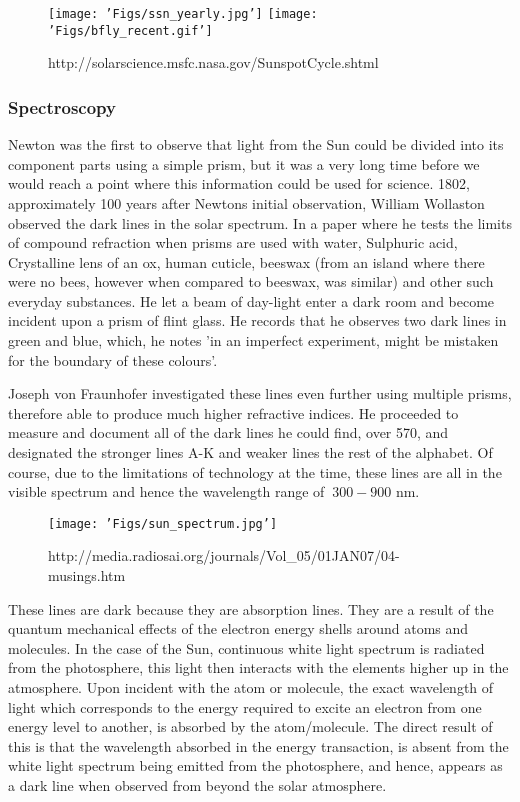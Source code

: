 \begin{figure}
	\texttt{[image: 'Figs/ssn\_yearly.jpg']}
	\texttt{[image: 'Figs/bfly\_recent.gif']}
	\caption{http://solarscience.msfc.nasa.gov/SunspotCycle.shtml}
	\label{fig:sunspot_count}
\end{figure}

\subsubsection{Spectroscopy}

Newton was the first to observe that light from the Sun could be divided into its component parts using a simple prism, but it was a very long time before we would reach a point where this information could be used for science.
1802, approximately 100 years after Newtons initial observation, William Wollaston observed the dark lines in the solar spectrum.
In a paper where he tests the limits of compound refraction when prisms are used with water, Sulphuric acid, Crystalline lens of an ox, human cuticle, beeswax (from an island where there were no bees, however when compared to beeswax, was similar) and other such everyday substances.
He let a beam of day-light enter a dark room and become incident upon a prism of flint glass.
He records that he observes two dark lines in green and blue, which, he notes 'in an imperfect experiment, might be mistaken for the boundary of these colours'.

Joseph von Fraunhofer investigated these lines even further using multiple prisms, therefore able to produce much higher refractive indices. 
He proceeded to measure and document all of the dark lines he could find, over 570, and designated the stronger lines A-K and weaker lines the rest of the alphabet.
Of course, due to the limitations of technology at the time, these lines are all in the visible spectrum and hence the wavelength range of $~300 - 900$ nm.

\begin{figure}
	\texttt{[image: 'Figs/sun\_spectrum.jpg']}
	\label{fig:fraunhofer}
	\caption{http://media.radiosai.org/journals/Vol_05/01JAN07/04-musings.htm}
\end{figure}


These lines are dark because they are absorption lines.
They are a result of the quantum mechanical effects of the electron energy shells around atoms and molecules.
In the case of the Sun, continuous white light spectrum is radiated from the photosphere, this light then interacts with the elements higher up in the atmosphere.
Upon incident with the atom or molecule, the exact wavelength of light which corresponds to the energy required to excite an electron from one energy level to another, is absorbed by the atom/molecule.
The direct result of this is that the wavelength absorbed in the energy transaction, is absent from the white light spectrum being emitted from the photosphere, and hence, appears as a dark line when observed from beyond the solar atmosphere. 

